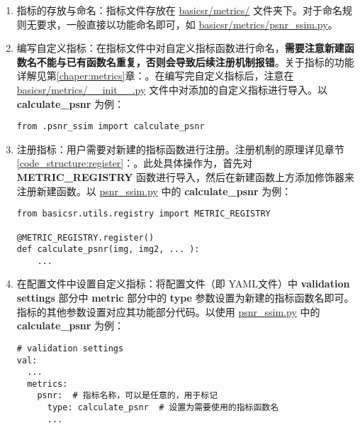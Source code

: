\documentclass[../main.tex]{subfiles}
\begin{document}
\begin{enumerate}[第 1 步]
    \item 指标的存放与命名：指标文件存放在 \href{https://github.com/XPixelGroup/BasicSR/tree/master/basicsr/metrics}{basicsr/metrics/} 文件夹下。对于命名规则无要求，一般直接以功能命名即可，如 \href{https://github.com/XPixelGroup/BasicSR/tree/master/basicsr/metrics/psnr_ssim.py}{basicsr/metrics/psnr\_ssim.py}。

    \item 编写自定义指标：在指标文件中对自定义指标函数进行命名，\textbf{需要注意新建函数名不能与已有函数名重复，否则会导致后续注册机制报错}。关于指标的功能详解见第\ref{chaper:metrics}章：。在编写完自定义指标后，注意在 \href{https://github.com/XPixelGroup/BasicSR/tree/master/basicsr/metrics/__init__.py}{basicsr/metrics/\_\_init\_\_.py} 文件中对添加的自定义指标进行导入。以 \textbf{calculate\_psnr} 为例：
          \begin{verbatim}
from .psnr_ssim import calculate_psnr
\end{verbatim}

    \item 注册指标：用户需要对新建的指标函数进行注册。注册机制的原理详见章节\ref{code_structure:register}：。此处具体操作为，首先对 \textbf{METRIC\_REGISTRY} 函数进行导入，然后在新建函数上方添加修饰器来注册新建函数。以 \href{https://github.com/XPixelGroup/BasicSR/tree/master/basicsr/metrics/psnr_ssim.py}{psnr\_ssim.py} 中的 \textbf{calculate\_psnr} 为例：
          \begin{verbatim}
from basicsr.utils.registry import METRIC_REGISTRY

@METRIC_REGISTRY.register()
def calculate_psnr(img, img2, ... ):
    ...
\end{verbatim}

    \item 在配置文件中设置自定义指标：将配置文件（即 YAML文件）中 \textbf{validation settings} 部分中 \textbf{metric} 部分中的  \textbf{type} 参数设置为新建的指标函数名即可。指标的其他参数设置对应其功能部分代码。以使用 \href{https://github.com/XPixelGroup/BasicSR/tree/master/basicsr/metrics/psnr_ssim.py}{psnr\_ssim.py} 中的 \textbf{calculate\_psnr} 为例：
          \begin{verbatim}
# validation settings
val:
  ...
  metrics:
    psnr:  # 指标名称，可以是任意的，用于标记
      type: calculate_psnr  # 设置为需要使用的指标函数名
      ...
\end{verbatim}
\end{enumerate}
\end{document}
